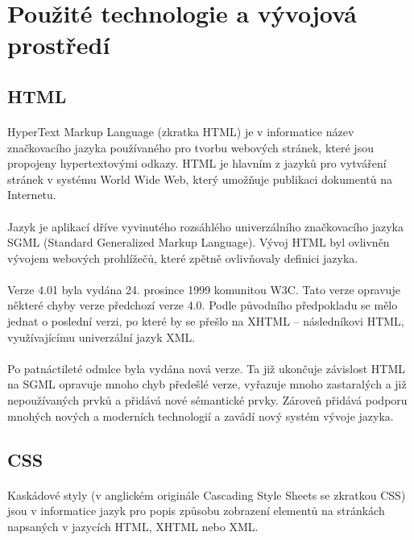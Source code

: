 \section{Použité technologie a vývojová prostředí}
\subsection{HTML}
\paragraph{}
HyperText Markup Language (zkratka HTML) je v informatice název značkovacího jazyka používaného pro tvorbu webových stránek, které jsou propojeny hypertextovými odkazy. HTML je hlavním z jazyků pro vytváření stránek v systému World Wide Web, který umožňuje publikaci dokumentů na Internetu.
\paragraph{}
Jazyk je aplikací dříve vyvinutého rozsáhlého univerzálního značkovacího jazyka SGML (Standard Generalized Markup Language). Vývoj HTML byl ovlivněn vývojem webových prohlížečů, které zpětně ovlivňovaly definici jazyka.
\paragraph{}
Verze 4.01 byla vydána 24. prosince 1999 komunitou W3C. Tato verze opravuje některé chyby verze předchozí verze 4.0. Podle původního předpokladu se mělo jednat o poslední verzi, po které by se přešlo na XHTML – následníkovi HTML, využívajícímu univerzální jazyk XML.
\paragraph{}
Po patnáctileté odmlce byla vydána nová verze. Ta již ukončuje závislost HTML na SGML opravuje mnoho chyb předešlé verze, vyřazuje mnoho zastaralých a již nepoužívaných prvků a přidává nové sémantické prvky. Zároveň přidává podporu mnohých nových a moderních technologií a zavádí nový systém vývoje jazyka.



\subsection{CSS}
\paragraph{}
Kaskádové styly (v anglickém originále Cascading Style Sheets se zkratkou CSS) jsou v informatice jazyk pro popis způsobu zobrazení elementů na stránkách napsaných v jazycích HTML, XHTML nebo XML.
